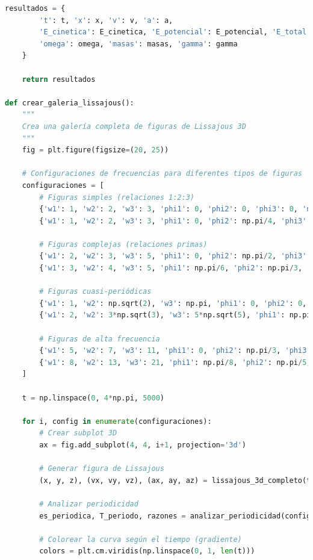 \documentclass{article}
\begin{document}
\begin{lstlisting}[language=Python, caption={Análisis completo de figuras de Lissajous 3D y osciladores acoplados}]
    resultados = {
        't': t, 'x': x, 'v': v, 'a': a,
        'E_cinetica': E_cinetica, 'E_potencial': E_potencial, 'E_total': E_total,
        'omega': omega, 'masas': masas, 'gamma': gamma
    }
    
    return resultados

def crear_galeria_lissajous():
    """
    Crea una galería completa de figuras de Lissajous 3D
    """
    fig = plt.figure(figsize=(20, 25))
    
    # Configuraciones de frecuencias para diferentes tipos de figuras
    configuraciones = [
        # Figuras simples (relaciones 1:2:3)
        {'w1': 1, 'w2': 2, 'w3': 3, 'phi1': 0, 'phi2': 0, 'phi3': 0, 'nombre': 'Simple 1:2:3'},
        {'w1': 1, 'w2': 2, 'w3': 3, 'phi1': 0, 'phi2': np.pi/4, 'phi3': np.pi/2, 'nombre': 'Desfasada 1:2:3'},
        
        # Figuras complejas (relaciones primas)
        {'w1': 2, 'w2': 3, 'w3': 5, 'phi1': 0, 'phi2': np.pi/2, 'phi3': np.pi, 'nombre': 'Prima 2:3:5'},
        {'w1': 3, 'w2': 4, 'w3': 5, 'phi1': np.pi/6, 'phi2': np.pi/3, 'phi3': np.pi/4, 'nombre': 'Compleja 3:4:5'},
        
        # Figuras cuasi-periódicas
        {'w1': 1, 'w2': np.sqrt(2), 'w3': np.pi, 'phi1': 0, 'phi2': 0, 'phi3': 0, 'nombre': 'Cuasi-periódica'},
        {'w1': 2, 'w2': 3*np.sqrt(3), 'w3': 5*np.sqrt(5), 'phi1': np.pi/4, 'phi2': np.pi/6, 'phi3': np.pi/8, 'nombre': 'Irracional'},
        
        # Figuras de alta frecuencia
        {'w1': 5, 'w2': 7, 'w3': 11, 'phi1': 0, 'phi2': np.pi/3, 'phi3': 2*np.pi/3, 'nombre': 'Alta frecuencia'},
        {'w1': 8, 'w2': 13, 'w3': 21, 'phi1': np.pi/8, 'phi2': np.pi/5, 'phi3': np.pi/3, 'nombre': 'Fibonacci'},
    ]
    
    t = np.linspace(0, 4*np.pi, 5000)
    
    for i, config in enumerate(configuraciones):
        # Crear subplot 3D
        ax = fig.add_subplot(4, 4, i+1, projection='3d')
        
        # Generar figura de Lissajous
        (x, y, z), (vx, vy, vz), (ax, ay, az) = lissajous_3d_completo(t, **config)
        
        # Analizar periodicidad
        es_periodica, T_periodo, razones = analizar_periodicidad(config['w1'], config['w2'], config['w3'])
        
        # Colorear la curva según el tiempo (gradiente)
        colors = plt.cm.viridis(np.linspace(0, 1, len(t)))
        

\end{lstlisting}
\end{document}
